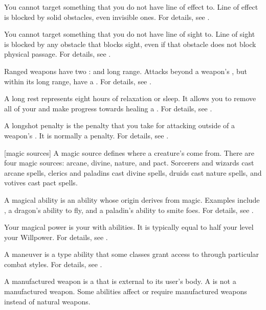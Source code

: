  You cannot target something that you do not have line of effect to.
Line of effect is blocked by solid obstacles, even invisible ones.
For details, see .

 You cannot target something that you do not have line of sight to.
Line of sight is blocked by any obstacle that blocks sight, even if that obstacle does not block physical passage.
For details, see .

 Ranged weapons have two :  and long range.
Attacks beyond a weapon's , but within its long range, have a  .
For details, see .

 A long rest represents eight hours of relaxation or sleep.
It allows you to remove all of your  and make progress towards healing a .
For details, see .

 A longshot penalty is the penalty that you take for attacking outside of a weapon's .
It is normally a   penalty.
For details, see .

[magic sources] A magic source defines where a creature's  come from.
There are four magic sources: arcane, divine, nature, and pact.
Sorcerers and wizards cast arcane spells, clerics and paladins cast divine spells, druids cast nature spells, and votives cast pact spells.

 A magical ability is an ability whose origin derives from magic.
Examples include , a dragon's ability to fly, and a paladin's ability to smite foes.
For details, see .

 Your magical power is your  with \magical abilities.
It is typically equal to half your level \add your Willpower.
For details, see .

 A maneuver is a type  ability that some classes grant access to through particular combat styles.
For details, see .

 A manufactured weapon is a  that is external to its user's body.
A  is not a manufactured weapon.
Some abilities affect or require manufactured weapons instead of natural weapons.

